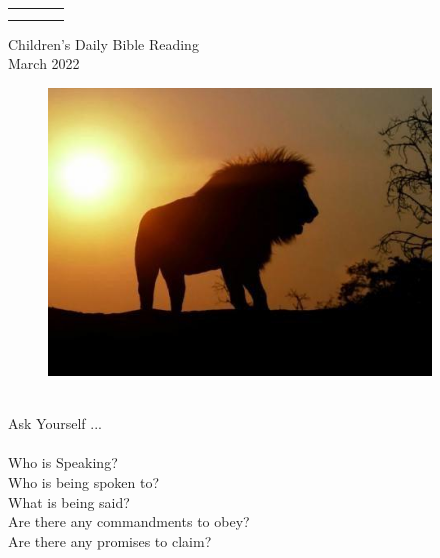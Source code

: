 \documentclass[11pt,landscape,twocolumn,letterpaper]{article}
\begin{document}
\newpage
\begin{tabular}{p{0.5in}p{0.6in}p{2.3in}p{0.35in}}
  \textcolor[rgb]{0.00,0.00,1.00}{} & \textcolor[rgb]{0.00,0.00,1.00}{} & & \textcolor[rgb]{0.00,0.00,1.00}{} \\
   & \multicolumn{2}{l}{\textcolor[rgb]{1.00,0.00,0.00}{}}& \textcolor[rgb]{0.00,0.00,1.00}{}\\
\end{tabular}
\newpage
\LARGE
\begin{center}
\textcolor[rgb]{0.98,0.00,0.00}{Children's Daily Bible Reading}\\
\textcolor[rgb]{0.00,0.00,1.00}{March 2022}\\
\end{center}


\begin{figure}[htp]
    \centering
  \includegraphics[width=4.0in]{March}\\
\end{figure}

\begin{center}
\textcolor[rgb]{0.00,0.00,1.00}{\\Ask Yourself ...\\}
\textcolor[rgb]{1.00,0.00,0.00}{\\Who is Speaking?\\Who is being spoken to?\\What is being said?\\Are there
any commandments to obey?\\Are there any promises to claim?}
\end{center}
\end{document}
